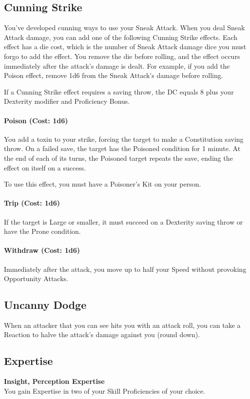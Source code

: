 \documentclass[letterpaper,openany,oneside,twocolumn]{book}
\begin{document}
\subsection*{Cunning Strike}
You've developed cunning ways to use your Sneak Attack. When you deal Sneak Attack damage, you can add one of the following Cunning Strike effects. Each effect has a die cost, which is the number of Sneak Attack damage dice you must forgo to add the effect. You remove the die before rolling, and the effect occurs immediately after the attack's damage is dealt. For example, if you add the Poison effect, remove 1d6 from the Sneak Attack's damage before rolling.

If a Cunning Strike effect requires a saving throw, the DC equals 8 plus your Dexterity modifier and Proficiency Bonus.

\paragraph*{Poison (Cost: 1d6)} You add a toxin to your strike, forcing the target to make a Constitution saving throw. On a failed save, the target has the Poisoned condition for 1 minute. At the end of each of its turns, the Poisoned target repeats the save, ending the effect on itself on a success.

To use this effect, you must have a Poisoner's Kit on your person.

\paragraph*{Trip (Cost: 1d6)} If the target is Large or smaller, it must succeed on a Dexterity saving throw or have the Prone condition.

\paragraph*{Withdraw (Cost: 1d6)} Immediately after the attack, you move up to half your Speed without provoking Opportunity Attacks.
\subsection*{Uncanny Dodge}
When an attacker that you can see hits you with an attack roll, you can take a Reaction to halve the attack's damage against you (round down).
\subsection*{Expertise}
\textbf{Insight, Perception Expertise}\\
You gain Expertise in two of your Skill Proficiencies of your choice.
\end{document}
